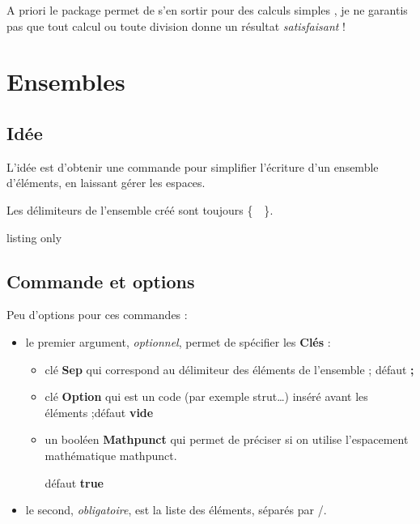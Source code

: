 \documentclass[a4paper,french,11pt]{article}
\newcommand\ctex[1]{\tcbox[vignettelatex]{#1}}
\newcommand\Cle[1]{{\bfseries\sffamily\textlangle #1\textrangle}}
\begin{document}
\begin{noteblock}
A priori le package \ctex{xint} permet de s'en sortir pour des calculs \og simples \fg, je ne garantis pas que tout calcul ou toute division donne un résultat \textit{satisfaisant} !
\end{noteblock}

\pagebreak

\section{Ensembles}\label{ensembles}

\subsection{Idée}

\begin{tipblock}
L'idée est d'obtenir une commande pour simplifier l'écriture d'un ensemble d'éléments, en laissant gérer les espaces.

Les délimiteurs de l'ensemble créé sont toujours \textsf{\{~~\}}.
\end{tipblock}

\begin{PresCodeTexPL}{listing only}
\end{PresCodeTexPL}

\subsection{Commande et options}

\begin{cautionblock}
Peu d'options pour ces commandes :

\begin{itemize}
\item le premier argument, \textit{optionnel}, permet de spécifier les \Cle{Clés} :
\begin{itemize}
	\item clé \Cle{Sep} qui correspond au délimiteur des éléments de l'ensemble ; \hfill{}défaut \Cle{;}
	\item clé \Cle{Option} qui est un code (par exemple \textsf{strut}\dots) inséré avant les éléments ;\hfill{}défaut \Cle{vide}
	\item un booléen \Cle{Mathpunct} qui permet de préciser si on utilise l'espacement mathématique \textsf{mathpunct}.
	
	\hfill{}défaut \Cle{true}
\end{itemize}
\item le second, \textit{obligatoire}, est la \textsf{liste} des éléments, séparés par \textsf{/}.
\end{itemize}
\vspace*{-\baselineskip}\leavevmode
\end{cautionblock}
\end{document}
